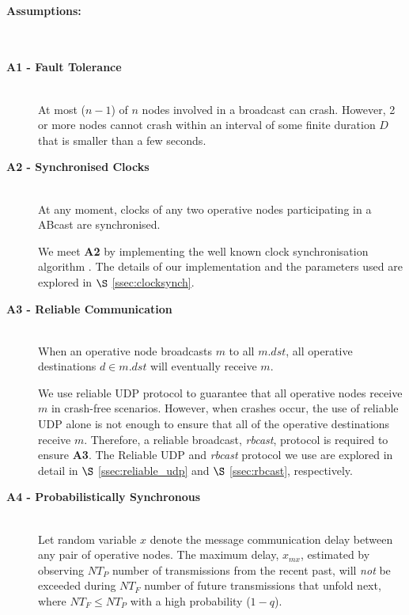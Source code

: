 	\paragraph{Assumptions:}\hspace{0pt} \\
	\begin{description}	
		\item [\textbf{A1 - Fault Tolerance}] \hfill \\
		At most ($n-1$) of $n$ nodes involved in a broadcast can crash. However, 2 or more nodes cannot crash within an interval of some finite duration $D$ that is smaller than a few seconds.
		
        \item [\textbf{A2 - Synchronised Clocks}] \hfill \\
		At any moment, clocks of any two operative nodes participating in a \textsf{ABcast} are synchronised.  
		
		We meet \textbf{A2} by implementing the well known clock synchronisation algorithm \citep{Cristian:1996:SA:227210.227231}.  The details of our implementation and the parameters used are explored in $\S$ \ref{ssec:clocksynch}.		
		
		\item [\textbf{A3 - Reliable Communication}] \hfill \\
		When an operative node broadcasts $m$ to all $m.dst$, all operative destinations $d \in m.dst$ will eventually receive $m$.  
		
		We use reliable UDP protocol to guarantee that all operative nodes receive $m$ in crash-free scenarios.  However, when crashes occur, the use of reliable UDP alone is not enough to ensure that all of the operative destinations receive $m$.  Therefore, a reliable broadcast, \emph{rbcast}, protocol is required to ensure \textbf{A3}.  The Reliable UDP and \emph{rbcast} protocol we use are explored in detail in $\S$ \ref{ssec:reliable_udp} and $\S$ \ref{ssec:rbcast}, respectively.  
		
		\item [\textbf{A4 - Probabilistically Synchronous}] \hfill \\
        Let random variable $x$ denote the message communication delay between any pair of operative nodes. The maximum delay, $x_{mx}$, estimated by observing $NT_P$ number of transmissions from the recent past, will \emph{not} be exceeded during $NT_F$ number of future transmissions that unfold next, where $NT_F \leq NT_P$ with a high probability ($1 - q$).
		

\end{description}
